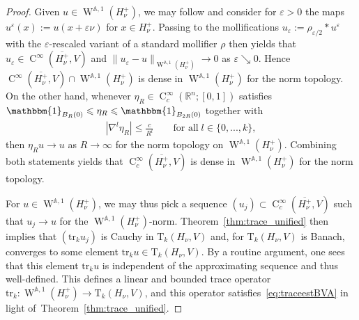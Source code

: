 \documentclass[a4paper,10pt]{amsart}
\newcommand{\R}{\mathbb R}
\renewcommand{\leq}{\leqslant}
\newcommand{\sobo}{\operatorname{W}}
\newcommand{\hold}{\operatorname{C}}
\newcommand{\ball}{B}
\newcommand{\A}{\mathbb{A}}
\numberwithin{equation}{section}
\theoremstyle{remark}
\numberwithin{equation}{section}
\begin{document}
	\begin{proof}
		Given $u\in\sobo^{\A,1}(H_{\nu}^{+})$, we may follow \cite[\S 5.3.3]{Evans} and consider for $\varepsilon>0$ the maps $u^{\varepsilon}(x):=u(x+\varepsilon\nu)$ for $x\in H_{\nu}^{+}$. Passing to the mollifications $u_{\varepsilon}:=\rho_{\varepsilon/2}*u^{\varepsilon}$ with the $\varepsilon$-rescaled variant of a standard mollifier $\rho$ then yields that $u_{\varepsilon}\in\hold^{\infty}(\overline{H_{\nu}^{+}},V)$ and $\|u_{\varepsilon}-u\|_{\sobo^{\A,1}(H_{\nu}^{+})}\to 0$ as $\varepsilon\searrow 0$. Hence $\hold^{\infty}(\overline{H_{\nu}^{+}},V)\cap\sobo^{\A,1}(H_{\nu}^{+})$ is dense in $\sobo^{\A,1}(H_{\nu}^{+})$ for the norm topology. On the other hand, whenever $\eta_{R}\in\hold_{c}^{\infty}(\R^{n};[0,1])$ satisfies $\mathbbm{1}_{\ball_{R}(0)}\leq \eta_{R}\leq\mathbbm{1}_{\ball_{2R}(0)}$ together with 
		\begin{align*}
			|\nabla^{l}\eta_{R}|\leq \frac{c}{R^{l}}\qquad\text{for all}\;l\in\{0,...,k\}, 
		\end{align*}
		then $\eta_{R}u\to u$ as $R\to\infty$ for the norm topology on $\sobo^{\A,1}(H_{\nu}^{+})$. Combining both statements yields that $\hold_{c}^{\infty}(\overline{H_{\nu}^{+}},V)$ is dense in $\sobo^{\A,1}(H_{\nu}^{+})$ for the norm topology.  
		
		For $u\in\sobo^{\A,1}(H_{\nu}^{+})$, we may thus pick a sequence $(u_{j})\subset\hold_{c}^{\infty}(\overline{H_{\nu}^{+}},V)$ such that $u_{j}\to u$ for the $\sobo^{\A,1}(H_{\nu}^{+})$-norm. Theorem~\ref{thm:trace_unified} then implies that $(\mathrm{tr}_{k}u_{j})$ is Cauchy in $\mathrm{T}_{k}(H_{\nu},V)$ and, for $\mathrm{T}_{k}(H_{\nu},V)$ is Banach, converges to some element $\mathrm{tr}_{k}u\in\mathrm{T}_{k}(H_{\nu},V)$. By a routine argument, one sees that this element $\mathrm{tr}_{k}u$ is independent of the approximating sequence and thus well-defined. This defines a linear and bounded trace operator $\mathrm{tr}_{k}\colon\sobo^{\A,1}(H_{\nu}^{+})\to\mathrm{T}_{k}(H_{\nu},V)$, and this operator satisfies~\eqref{eq:traceestBVA} in light of~Theorem~\ref{thm:trace_unified}.
		

\end{proof}
\end{document}
